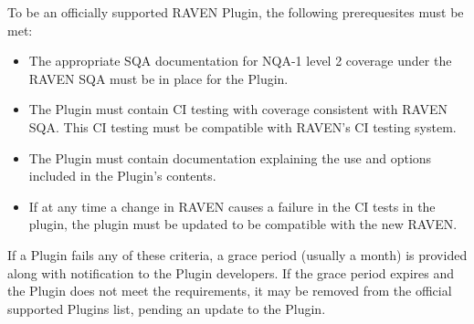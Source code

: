  To be an officially supported RAVEN Plugin, the following prerequesites must be met:
 \begin{itemize}
  \item The appropriate SQA documentation for NQA-1 level 2 coverage under the RAVEN SQA must be in place for the Plugin.
  \item The Plugin must contain CI testing with coverage consistent with RAVEN SQA. This CI testing must be compatible with RAVEN's CI testing system.
  \item The Plugin must contain documentation explaining the use and options included in the Plugin's contents.
  \item If at any time a change in RAVEN causes a failure in the CI tests in the plugin, the plugin must be updated to be compatible with the new RAVEN.
 \end{itemize}

 If a Plugin fails any of these criteria, a grace period (usually a month) is provided along with notification to the Plugin developers. If the grace period expires and the Plugin does not meet the requirements, it may be removed from the official supported Plugins list, pending an update to the Plugin.